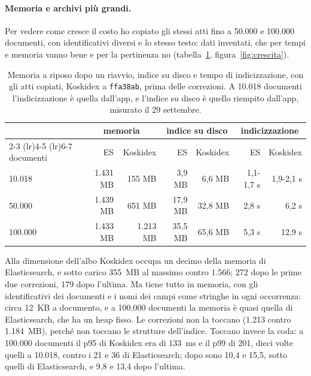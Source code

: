 \paragraph{Memoria e archivi più grandi.} Per vedere come cresce il costo ho
copiato gli stessi atti fino a 50.000 e 100.000 documenti, con identificativi
diversi e lo stesso testo: dati inventati, che per tempi e memoria vanno bene e
per la pertinenza no (tabella~\ref{tab:crescita}, figura~\ref{fig:crescita}).



\begin{table}[ht]
  \centering
  \small
  \begin{tabular}{lrrrrrr}
    \toprule
    & \multicolumn{2}{c}{memoria} & \multicolumn{2}{c}{indice su disco} &
    \multicolumn{2}{c}{indicizzazione} \\
    \cmidrule(lr){2-3} \cmidrule(lr){4-5} \cmidrule(lr){6-7}
    documenti & ES & Koskidex & ES & Koskidex & ES & Koskidex \\
    \midrule
    10.018 & 1.431 MB & 155 MB & 3,9 MB & 6,6 MB & 1,1-1,7 s & 1,9-2,1 s \\
    50.000 & 1.439 MB & 651 MB & 17,9 MB & 32,8 MB & 2,8 s & 6,2 s \\
    100.000 & 1.433 MB & 1.213 MB & 35,5 MB & 65,6 MB & 5,3 s & 12,9 s \\
    \bottomrule
  \end{tabular}
  \caption{Memoria a riposo dopo un riavvio, indice su disco e tempo di
  indicizzazione, con gli atti copiati, Koskidex a \texttt{ffa38ab}, prima delle
  correzioni. A 10.018 documenti l'indicizzazione è quella dall'app, e l'indice
  su disco è quello riempito dall'app, misurato il 29 settembre.}
  \label{tab:crescita}
\end{table}

Alla dimensione dell'albo Koskidex occupa un decimo della memoria di
Elasticsearch, e sotto carico 355~MB al massimo contro 1.566; 272 dopo le
prime due correzioni, 179 dopo l'ultima. Ma tiene tutto in
memoria, con gli identificativi dei documenti e i nomi dei campi come stringhe
in ogni occorrenza: circa 12~KB a documento, e a 100.000 documenti la memoria è
quasi quella di Elasticsearch, che ha un heap fisso. Le correzioni non la
toccano (1.213 contro 1.184~MB), perché non toccano le strutture dell'indice.
Toccano invece la coda: a 100.000 documenti il p95 di Koskidex era di 133~ms e
il p99 di 201, dieci volte quelli a 10.018, contro i 21 e 36 di Elasticsearch;
dopo sono 10,4 e 15,5, sotto quelli di Elasticsearch, e 9,8 e 13,4 dopo
l'ultima.

